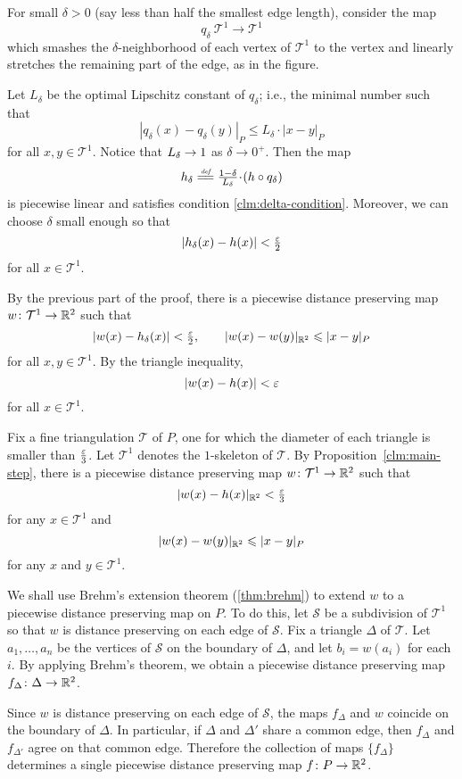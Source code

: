 For small $\delta > 0$ (say less than half the smallest edge length), consider the map 
$$q_\delta\:\mathcal{T}^1\to\mathcal{T}^1$$ 
which smashes the $\delta$-neighborhood of each vertex of $\mathcal{T}^1$ to the vertex 
and linearly stretches the remaining part of the edge, as in the figure.

Let $L_\delta$ be the optimal Lipschitz constant of $q_\delta$;
i.e., the minimal number such that 
\[|q_\delta(x)-q_\delta(y)|_P\le L_\delta\cdot|x-y|_P\] for all $x,y \in \mathcal{T}^1$.
Notice that $L_\delta\z\to 1$ as $\delta\to 0^+$.
Then the map 
\[h_\delta
\df
\tfrac{1-\delta}{L_\delta}\cdot (h\circ q_\delta)\]
is piecewise linear and satisfies condition \ref{clm:delta-condition}.
Moreover, we can choose $\delta$ small enough so that
\[|h_\delta(x) - h(x)| < \tfrac{\varepsilon}{2}\] for all $x \in \mathcal{T}^1$.

By the previous part of the proof, there is a piecewise distance preserving map $w\colon \mathcal{T}^1 \to \mathbb{R}^2$ such that
$$|w(x) - h_\delta(x)| < \tfrac{\varepsilon}{2}, \qquad |w(x) - w(y)|_{\mathbb{R}^2} \leqslant |x - y|_P$$
for all $x, y \in \mathcal{T}^1$.  By the triangle inequality,
$$|w(x) - h(x)| < \varepsilon$$ for all $x \in \mathcal{T}^1$.
\qeds

Fix a fine
triangulation $\mathcal{T}$
of $P$,
one for which the diameter of each triangle is smaller than $\tfrac{\varepsilon}{3}$.
Let $\mathcal{T}^1$ denotes the $1$-skeleton of $\mathcal{T}$.
By Proposition~\ref{clm:main-step}, 
there is a piecewise distance preserving map $w\colon\mathcal{T}^1\to\mathbb{R}^2$ such that
$$|w(x)-h(x)|_{\mathbb{R}^2} < \tfrac{\varepsilon}{3}$$
for any $x\in \mathcal{T}^1$ and
$$|w(x)-w(y)|_{\mathbb{R}^2}\leqslant|x-y|_P$$
for any $x$ and $y\in \mathcal{T}^1$.

We shall use Brehm's extension theorem (\ref{thm:brehm}) to extend $w$ to a piecewise distance preserving map on $P$.
To do this, let $\mathcal{S}$ be a subdivision of $\mathcal{T}^1$
so that $w$ is distance preserving on each  edge of $\mathcal{S}$.
Fix a triangle $\Delta$ of $\mathcal{T}$.
Let $a_1,\dots, a_n$ be the vertices of $\mathcal{S}$ on the boundary of $\Delta$, 
and let $b_i=w(a_i)$ for each $i$.
By applying Brehm's theorem, we obtain a piecewise distance preserving map $f_\Delta\colon \Delta \to \mathbb{R}^2$.

Since $w$ is distance preserving on each edge of $\mathcal{S}$,
the maps $f_\Delta$ and $w$ coincide on the boundary of $\Delta$.
In particular, if $\Delta$ and $\Delta'$ share a common edge, then $f_\Delta$ and $f_{\Delta'}$ agree on that common edge.  Therefore the collection of maps $\{f_\Delta\}$ determines a single piecewise distance preserving map $f\colon P\to\mathbb{R}^2$.

